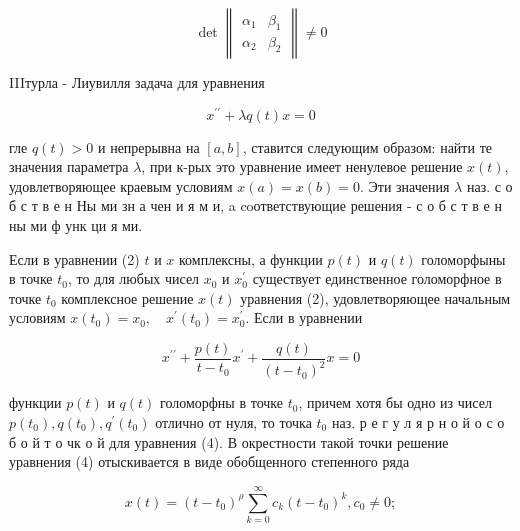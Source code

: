\documentclass[10pt]{article}
\begin{document}
\[

\operatorname{det}\left\|\begin{array}{ll}

\alpha_{1} & \beta_{1} \\

\alpha_{2} & \beta_{2}

\end{array}\right\| \neq 0

\]



IIIтурла - Лиувилля задача для уравнения



\[

x^{\prime \prime}+\lambda q(t) x=0

\]



гле $q(t)>0$ и непрерывна на $[a, b]$, ставится следующим образом: найти те значения параметра $\lambda$, при к-рых это уравнение имеет ненулевое решение $x(t)$, удовлетворяющее краевым условиям $x(a)=x(b)=0$. Эти значения $\lambda$ наз. с о б с т в е н Ны ми зн а чен и я м и, a coответствующие решения - с о б с т в е н ны ми ф унк ци я ми.



Если в уравнении (2) $t$ и $x$ комплексны, а функции $p(t)$ и $q(t)$ голоморфыны в точке $t_{0}$, то для любых чисел $x_{0}$ и $x_{0}^{\prime}$ существует единственное голоморфное в точке $t_{0}$ комплексное решение $x(t)$ уравнения (2), удовлетворяющее начальным условиям $x\left(t_{0}\right)=x_{0}, \quad x^{\prime}\left(t_{0}\right)=x_{0}^{\prime}$. Если в уравнении



\[

x^{\prime \prime}+\frac{p(t)}{t-t_{0}} x^{\prime}+\frac{q(t)}{\left(t-t_{0}\right)^{2}} x=0

\]



функции $p(t)$ и $q(t)$ голоморфны в точке $t_{0}$, причем хотя бы одно из чисел $p\left(t_{0}\right), q\left(t_{0}\right), q^{\prime}\left(t_{0}\right)$ отлично от нуля, то точка $t_{0}$ наз. р е г у л я р н о й $о$ с о б о й т о чк о й для уравнения (4). В окрестности такой точки решение уравнения (4) отыскивается в виде обобщенного степенного ряда



\[

x(t)=\left(t-t_{0}\right)^{\rho} \sum_{k=0}^{\infty} c_{k}\left(t-t_{0}\right)^{k}, c_{0} \neq 0 ;

\]
\end{document}
